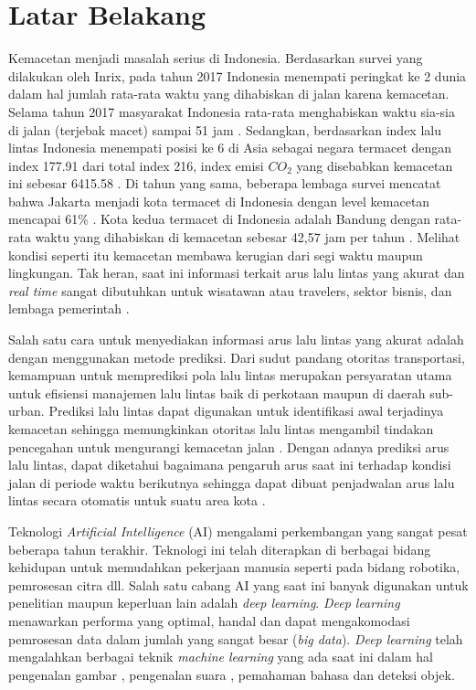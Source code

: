 \documentclass[../thesis.tex]{subfiles}
\begin{document}
\section{Latar Belakang}

Kemacetan menjadi masalah serius di Indonesia. Berdasarkan survei yang dilakukan oleh Inrix, pada tahun 2017 Indonesia menempati peringkat ke 2 dunia dalam hal jumlah rata-rata waktu yang dihabiskan di jalan karena kemacetan. Selama tahun 2017 masyarakat Indonesia rata-rata menghabiskan waktu sia-sia di jalan (terjebak macet) sampai 51 jam \cite{Inrix2017Survei}. Sedangkan, berdasarkan index lalu lintas Indonesia menempati posisi ke 6 di Asia sebagai negara termacet dengan index 177.91 dari total index 216, index emisi $CO_2$ yang disebabkan kemacetan ini sebesar 6415.58 \cite{Numbeo2015Survei}. 
Di tahun yang sama, beberapa lembaga survei mencatat bahwa Jakarta menjadi kota termacet di Indonesia dengan level kemacetan mencapai 61\% \cite{TomTom2017Survei}. Kota kedua termacet di Indonesia adalah Bandung dengan rata-rata waktu yang dihabiskan di kemacetan sebesar 42,57 jam per tahun \cite{Inrix2017Survei}. Melihat kondisi seperti itu kemacetan membawa kerugian dari segi waktu maupun lingkungan.
Tak heran, saat ini informasi terkait arus lalu lintas yang akurat dan \textit{real time} sangat dibutuhkan untuk wisatawan atau travelers, sektor bisnis, dan lembaga pemerintah \cite{Zhang2008DynaCAS}.

Salah satu cara untuk menyediakan informasi arus lalu lintas yang akurat adalah dengan menggunakan metode prediksi. Dari sudut pandang otoritas transportasi, kemampuan untuk memprediksi pola lalu lintas merupakan persyaratan utama untuk efisiensi manajemen lalu lintas baik di perkotaan maupun di daerah sub-urban. Prediksi lalu lintas dapat digunakan untuk identifikasi awal terjadinya kemacetan sehingga memungkinkan otoritas lalu lintas mengambil tindakan pencegahan untuk mengurangi kemacetan
jalan \cite{Djahel2014SmartCity}. Dengan adanya prediksi arus lalu lintas, dapat diketahui bagaimana pengaruh arus saat ini terhadap kondisi jalan di periode waktu berikutnya sehingga dapat dibuat penjadwalan arus lalu lintas secara otomatis untuk suatu area kota \cite{Yuangfang2018TrafficPrediction}.

Teknologi \textit{Artificial Intelligence} (AI) mengalami perkembangan yang sangat pesat beberapa tahun terakhir. Teknologi ini telah diterapkan di berbagai bidang kehidupan untuk memudahkan pekerjaan manusia seperti pada bidang robotika, pemrosesan citra dll. 
Salah satu cabang AI yang saat ini banyak digunakan untuk penelitian maupun keperluan lain adalah \textit{deep learning}. \textit{Deep learning} menawarkan performa yang optimal, handal dan dapat mengakomodasi pemrosesan data dalam jumlah yang sangat besar (\textit{big data}). 
\textit{Deep learning} telah mengalahkan berbagai teknik \textit{machine learning} yang ada saat ini dalam hal pengenalan gambar \cite{CNNinImageNet}, pengenalan suara \cite{Hinton2012Speech}, pemahaman bahasa \cite{Collobert2011NLP} dan deteksi objek.
\end{document}
